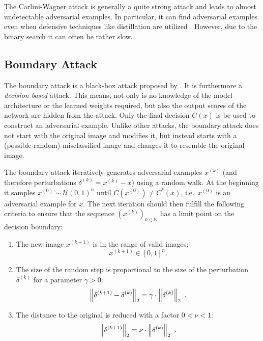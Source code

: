 The Carlini-Wagner attack is generally a quite strong attack and leads to almost undetectable adversarial examples.
In particular, it can find adversarial examples even when defensive techniques like distillation are utilized \citep{carlini}.
However, due to the binary search it can often be rather slow.

\subsection{Boundary Attack}

The boundary attack is a black-box attack proposed by \citet{boundary}. It is furthermore a \emph{decision based} attack. This means, not only is no knowledge of the model architecture or the learned weights required, but also the output scores of the network are hidden from the attack. Only the final decision $C(x)$ is be used to construct an adversarial example.
Unlike other attacks, the boundary attack does not start with the original image and modifies it, but instead starts with a (possible random) misclassified image and changes it to resemble the original image.

The boundary attack iteratively generates adversarial examples $x^{(k)}$ (and therefore perturbations $\delta^{(k)} = x^{(k)} - x$) using a random walk. At the beginning it samples $x^{(0)} \sim \mathcal{U}(0,1)^n$ until $C(x^{(0)}) \neq C^*(x)$, i.e.\ $x^{(0)}$ is an adversarial example for $x$.
The next iteration should then fulfill the following criteria to ensure that the sequence $(x^{(k)})_{k \in \mathbb{N}}$ has a limit point on the decision boundary:

\begin{enumerate}
	\item The new image $x^{(k+1)}$ is in the range of valid images:
	\begin{equation*}
	x^{(k+1)}\in [0,1]^n
	\text{.}
	\end{equation*}
	
	\item The size of the random step is proportional to the size of the perturbation $\delta^{(k)}$ for a parameter $\gamma > 0$:
	\begin{equation*}
	\left \lVert \delta^{(k+1)} - \delta^{(k)} \right \rVert _{2} = \gamma \cdot \left \lVert \delta^{(k)} \right \rVert _{2}
	\text{ .}
	\end{equation*}
	
	\item The distance to the original is reduced with a factor $0<\nu<1$:
	\begin{equation*}
	\left \lVert \delta^{(k+1)} \right \rVert _{2} = \nu \cdot \left \lVert \delta^{(k)} \right \rVert _{2}
	\text{ .}
	\end{equation*}
\end{enumerate}


